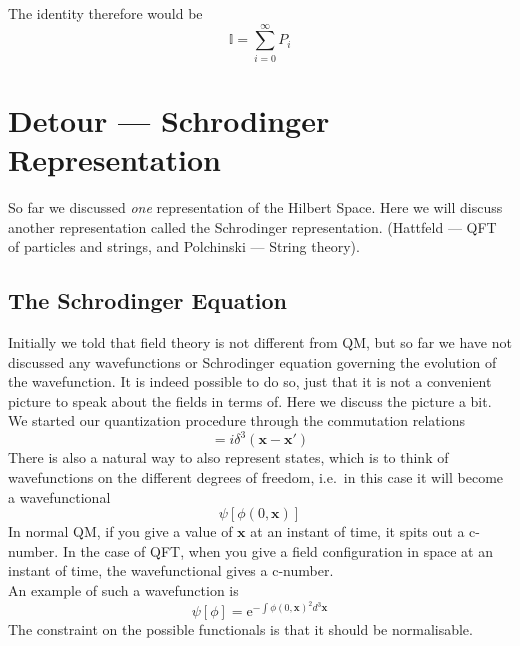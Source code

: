 \documentclass[11pt]{article}
\newcommand{\e}{\mathrm{e}}
\numberwithin{equation}{section}
\begin{document}
    The identity therefore would be 
    \begin{equation*}
        \mathbb{I} = \sum_{i=0}^\infty P_i
    \end{equation*}
    
    \newpage
    \section{Detour — Schrodinger Representation}
    So far we discussed \textit{one} representation of the Hilbert Space. Here we will discuss another representation called the Schrodinger representation. (Hattfeld — QFT of particles and strings, and Polchinski — String theory).

    \subsection{The Schrodinger Equation}

    Initially we told that field theory is not different from QM, but so far we have not discussed any wavefunctions or Schrodinger equation governing the evolution of the wavefunction. It is indeed possible to do so, just that it is not a convenient picture to speak about the fields in terms of. Here we discuss the picture a bit.\\

    We started our quantization procedure through the commutation relations
    \begin{equation}
        [\phi(0, \textbf{x}), \Pi(0, \textbf{x}')] = i\delta^3(\textbf{x} - \textbf{x}')
    \end{equation}
    There is also a natural way to also represent states, which is to think of wavefunctions on the different degrees of freedom, i.e.\ in this case it will become a wavefunctional 
    \begin{equation}
        \psi[\phi(0,\textbf{x})]
    \end{equation}
    In normal QM, if you give a value of \(\textbf{x}\) at an instant of time, it spits out a c-number. In the case of QFT, when you give a field configuration in space at an instant of time, the wavefunctional gives a c-number. \\

    An example of such a wavefunction is 
    \begin{equation}
        \psi[\phi] = \e^{-\int \phi(0, \textbf{x})^2d^3\textbf{x}}
    \end{equation}
    The constraint on the possible functionals is that it should be normalisable.\\
\end{document}
